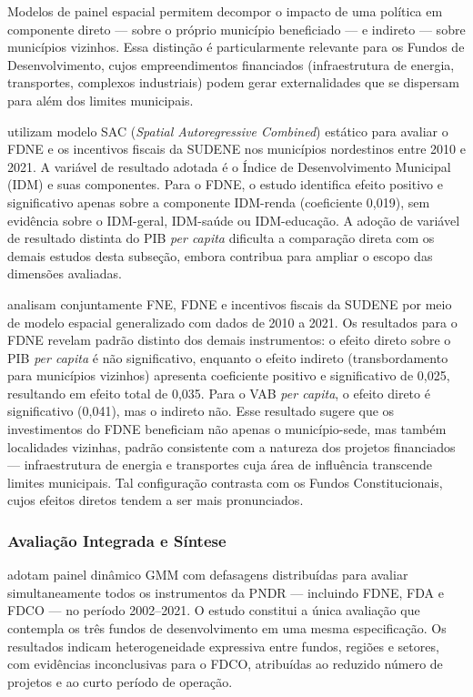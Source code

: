 Modelos de painel espacial permitem decompor o impacto de uma política em componente direto --- sobre o próprio município beneficiado --- e indireto --- sobre municípios vizinhos. Essa distinção é particularmente relevante para os Fundos de Desenvolvimento, cujos empreendimentos financiados (infraestrutura de energia, transportes, complexos industriais) podem gerar externalidades que se dispersam para além dos limites municipais.

 utilizam modelo SAC (\textit{Spatial Autoregressive Combined}) estático para avaliar o FDNE e os incentivos fiscais da SUDENE nos municípios nordestinos entre 2010 e 2021. A variável de resultado adotada é o Índice de Desenvolvimento Municipal (IDM) e suas componentes. Para o FDNE, o estudo identifica efeito positivo e significativo apenas sobre a componente IDM-renda (coeficiente 0,019), sem evidência sobre o IDM-geral, IDM-saúde ou IDM-educação. A adoção de variável de resultado distinta do PIB \textit{per capita} dificulta a comparação direta com os demais estudos desta subseção, embora contribua para ampliar o escopo das dimensões avaliadas.

 analisam conjuntamente FNE, FDNE e incentivos fiscais da SUDENE por meio de modelo espacial generalizado com dados de 2010 a 2021. Os resultados para o FDNE revelam padrão distinto dos demais instrumentos: o efeito direto sobre o PIB \textit{per capita} é não significativo, enquanto o efeito indireto (transbordamento para municípios vizinhos) apresenta coeficiente positivo e significativo de 0,025, resultando em efeito total de 0,035. Para o VAB \textit{per capita}, o efeito direto é significativo (0,041), mas o indireto não. Esse resultado sugere que os investimentos do FDNE beneficiam não apenas o município-sede, mas também localidades vizinhas, padrão consistente com a natureza dos projetos financiados --- infraestrutura de energia e transportes cuja área de influência transcende limites municipais. Tal configuração contrasta com os Fundos Constitucionais, cujos efeitos diretos tendem a ser mais pronunciados.

\subsubsection{Avaliação Integrada e Síntese}

 adotam painel dinâmico GMM com defasagens distribuídas para avaliar simultaneamente todos os instrumentos da PNDR --- incluindo FDNE, FDA e FDCO --- no período 2002--2021. O estudo constitui a única avaliação que contempla os três fundos de desenvolvimento em uma mesma especificação. Os resultados indicam heterogeneidade expressiva entre fundos, regiões e setores, com evidências inconclusivas para o FDCO, atribuídas ao reduzido número de projetos e ao curto período de operação.

